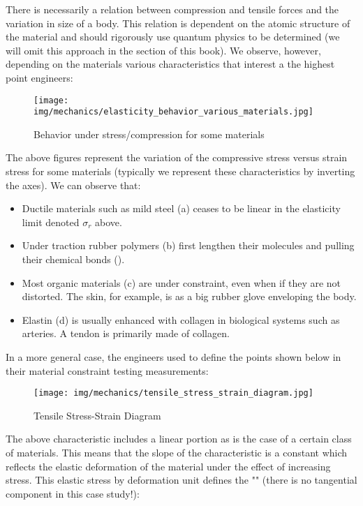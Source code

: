 	There is necessarily a relation between compression and tensile forces and the variation in size of a body. This relation is dependent on the atomic structure of the material and should rigorously use quantum physics to be determined (we will omit this approach in the section of this book). We observe, however, depending on the materials various characteristics that interest a the highest point engineers:
	\begin{figure}[H]
		\centering
		\texttt{[image: img/mechanics/elasticity\_behavior\_various\_materials.jpg]}
		\caption{Behavior under stress/compression for some materials}
	\end{figure}
		The above figures represent the variation of the compressive stress versus strain stress for some materials (typically we represent these characteristics by inverting the axes). We can observe that:
	\begin{itemize}
		\item Ductile materials such as mild steel (a) ceases to be linear in the elasticity limit denoted $\sigma_r$ above.

		\item Under traction rubber  polymers (b) first lengthen their molecules and pulling their chemical bonds ().

		\item Most organic materials (c) are under constraint, even when if they are not distorted. The skin, for example, is as a big rubber glove enveloping the body.

		\item Elastin (d) is usually enhanced with collagen in biological systems such as arteries. A tendon is primarily made of collagen.
	\end{itemize}
	In a more general case, the engineers used to define the points shown below in their material constraint testing measurements:
	\begin{figure}[H]
		\centering
		\texttt{[image: img/mechanics/tensile\_stress\_strain\_diagram.jpg]}
		\caption{Tensile Stress-Strain Diagram}
	\end{figure}
	The above characteristic includes a linear portion as is the case of a certain class of materials. This means that the slope of the characteristic is a constant which reflects the elastic deformation of the material under the effect of increasing stress. This elastic stress by deformation unit defines the "" (there is no tangential component in this case study!):
	
